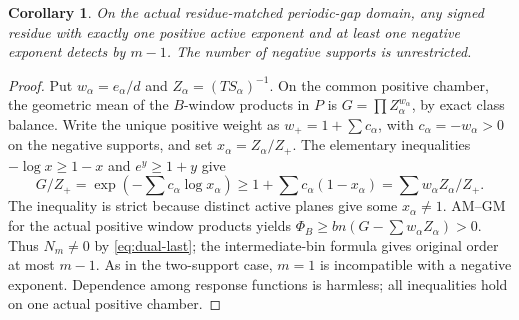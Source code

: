 \documentclass[11pt,a4paper]{amsart}
\numberwithin{equation}{section}
\theoremstyle{plain}
\newtheorem{corollary}[theorem]{Corollary}
\theoremstyle{definition}
\begin{document}
\begin{corollary}\label{cor:one-positive-short}
On the actual residue-matched periodic-gap domain, any signed residue with exactly one positive active exponent and at least one negative exponent detects by \(m-1\).  The number of negative supports is unrestricted.
\end{corollary}
\begin{proof}
Put \(w_\alpha=e_\alpha/d\) and \(Z_\alpha=(TS_\alpha)^{-1}\).  On the common positive chamber, the geometric mean of the \(B\)-window products in \(P\) is \(G=\prod Z_\alpha^{w_\alpha}\), by exact class balance.  Write the unique positive weight as \(w_+=1+\sum c_\alpha\), with \(c_\alpha=-w_\alpha>0\) on the negative supports, and set \(x_\alpha=Z_\alpha/Z_+\).  The elementary inequalities \(-\log x\ge1-x\) and \(e^y\ge1+y\) give
\[
 G/Z_+=\exp\left(-\sum c_\alpha\log x_\alpha\right)
 \ge1+\sum c_\alpha(1-x_\alpha)
 =\sum w_\alpha Z_\alpha/Z_+.
\]
The inequality is strict because distinct active planes give some \(x_\alpha\ne1\).  AM--GM for the actual positive window products yields
\(\Phi_B\ge bn(G-\sum w_\alpha Z_\alpha)>0\).
Thus \(N_m\ne0\) by \eqref{eq:dual-last}; the intermediate-bin formula gives original order at most \(m-1\).  As in the two-support case, \(m=1\) is incompatible with a negative exponent.  Dependence among response functions is harmless; all inequalities hold on one actual positive chamber.
\end{proof}
\end{document}
